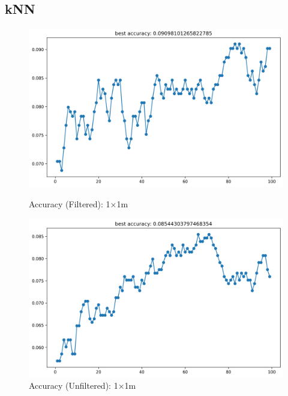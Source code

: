 \documentclass[runningheads]{llncs}
\begin{document}
\subsection*{kNN}

\begin{figure}[H]
	\centering
	\begin{minipage}{0.49\textwidth}
		\centering
		\includegraphics[width=\textwidth]{figures/filtered/knn_acc_1.png}
		\caption*{Accuracy (Filtered): 1×1m}
	\end{minipage}
	\hfill
	\begin{minipage}{0.49\textwidth}
		\centering
		\includegraphics[width=\textwidth]{figures/unfiltered/knn_acc_1.png}
		\caption*{Accuracy (Unfiltered): 1×1m}
	\end{minipage}
\end{figure}
\end{document}
